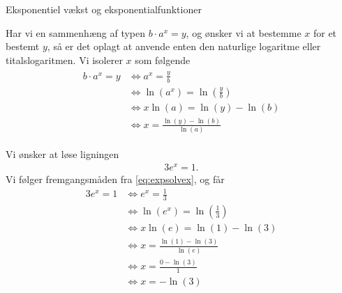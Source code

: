 
\begin{center}
\Huge
Eksponentiel vækst og eksponentialfunktioner
\end{center}
Har vi en sammenhæng af typen $b\cdot a^x = y$, og ønsker vi at bestemme $x$ for et bestemt $y$, så er det oplagt at anvende enten den naturlige logaritme eller titalslogaritmen. Vi isolerer $x$ som følgende
\begin{align}
\begin{split}\label{eq:expsolvex}
b\cdot a^x = y &\Leftrightarrow a^x = \frac{y}{b}\\
&\Leftrightarrow \ln(a^x) = \ln\left(\frac{y}{b}\right)\\
&\Leftrightarrow x\ln(a) = \ln(y)-\ln(b)\\
&\Leftrightarrow x = \frac{\ln(y)-\ln(b)}{\ln(a)}
\end{split}
\end{align}

\begin{exa}
Vi ønsker at løse ligningen 
\begin{align*}
3e^{x} = 1.
\end{align*}
Vi følger fremgangsmåden fra \eqref{eq:expsolvex}, og får
\begin{align*}
3e^x=1 &\Leftrightarrow e^x = \frac{1}{3}\\
&\Leftrightarrow \ln(e^x) = \ln\left(\frac{1}{3}\right)\\
&\Leftrightarrow x\ln(e) = \ln(1) - \ln(3)\\
&\Leftrightarrow x = \frac{\ln(1)-\ln(3)}{\ln(e)}\\
& \Leftrightarrow x = \frac{0-\ln(3)}{1}\\
&\Leftrightarrow x = -\ln(3)
\end{align*}
\end{exa}

